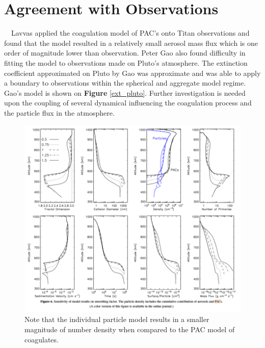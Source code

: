 \documentclass[useAMS,natbib]{mn2e}
\begin{document}
\section{Agreement with Observations}
\indent~~Lavvas applied the coagulation model of PAC's onto Titan observations and found that the model resulted in a relatively small aerosol mass flux which is one order of magnitude lower than observation. Peter Gao also found difficulty in fitting the model to observations made on Pluto's atmosphere. The extinction coefficient approximated on Pluto by Gao was approximate and was able to apply a boundary to observations within the spherical and aggregate model regime. Gao's model is shown on \textbf{Figure} \ref{ext_pluto}. Further investigation is needed upon the coupling of several dynamical influencing the coagulation process and the particle flux in the atmosphere. \\
\begin{figure}\centering
\includegraphics[scale = 0.4]{titan_model}
\caption{Note that the individual particle model results in a smaller magnitude of number density when compared to the PAC model of coagulates.}
\label{tit_model}
\end{figure}
\end{document}
